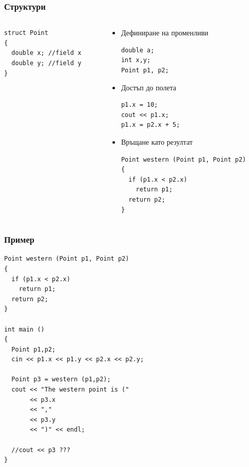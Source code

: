 \documentclass{beamer}
\begin{document}
\begin{frame}[fragile]
\frametitle{Структури} 


\begin{columns}[t]
  \begin{column}{0.3\textwidth}
\begin{lstlisting}
struct Point  
{
  double x; //field x
  double y; //field y
}
\end{lstlisting}  

  \end{column}
  \begin{column}{0.7\textwidth}

\begin{itemize}
\item Дефиниране на променливи
\begin{flushleft}
\begin{lstlisting}
double a; 
int x,y;
Point p1, p2;
\end{lstlisting}  
\end{flushleft}

\item Достъп до полета
\begin{flushleft}
\begin{lstlisting}
p1.x = 10;
cout << p1.x;
p1.x = p2.x + 5;
\end{lstlisting}  
\end{flushleft}


\item Връщане като резултат
\begin{flushleft}
\begin{lstlisting}
Point western (Point p1, Point p2)
{
  if (p1.x < p2.x)
    return p1;
  return p2;
}
\end{lstlisting}  
\end{flushleft}


\end{itemize}


  \end{column}
\end{columns}



\end{frame}



\begin{frame}[fragile]
\frametitle{Пример} 

\begin{lstlisting}
Point western (Point p1, Point p2)
{
  if (p1.x < p2.x)
    return p1;
  return p2;
}

int main ()
{
  Point p1,p2;
  cin << p1.x << p1.y << p2.x << p2.y;

  Point p3 = western (p1,p2);
  cout << "The western point is (" 
       << p3.x 
       << ","
       << p3.y
       << ")" << endl;

  //cout << p3 ???
}

\end{lstlisting}  

\end{frame}
\end{document}
